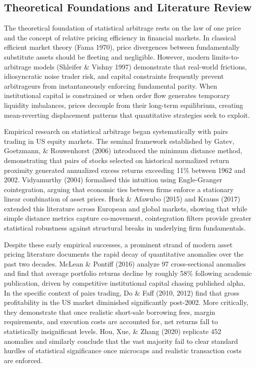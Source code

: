 \subsection{Theoretical Foundations and Literature Review}
The theoretical foundation of statistical arbitrage rests on the law of one price and the concept of relative pricing efficiency in financial markets. In classical efficient market theory (Fama 1970), price divergences between fundamentally substitute assets should be fleeting and negligible. However, modern limits-to-arbitrage models (Shleifer \& Vishny 1997) demonstrate that real-world frictions, idiosyncratic noise trader risk, and capital constraints frequently prevent arbitrageurs from instantaneously enforcing fundamental parity. When institutional capital is constrained or when order flow generates temporary liquidity imbalances, prices decouple from their long-term equilibrium, creating mean-reverting displacement patterns that quantitative strategies seek to exploit.

Empirical research on statistical arbitrage began systematically with pairs trading in US equity markets. The seminal framework established by Gatev, Goetzmann, \& Rouwenhorst (2006) introduced the minimum distance method, demonstrating that pairs of stocks selected on historical normalized return proximity generated annualized excess returns exceeding 11\% between 1962 and 2002. Vidyamurthy (2004) formalised this intuition using Engle-Granger cointegration, arguing that economic ties between firms enforce a stationary linear combination of asset prices. Huck \& Afawubo (2015) and Krauss (2017) extended this literature across European and global markets, showing that while simple distance metrics capture co-movement, cointegration filters provide greater statistical robustness against structural breaks in underlying firm fundamentals.

Despite these early empirical successes, a prominent strand of modern asset pricing literature documents the rapid decay of quantitative anomalies over the past two decades. McLean \& Pontiff (2016) analyze 97 cross-sectional anomalies and find that average portfolio returns decline by roughly 58\% following academic publication, driven by competitive institutional capital chasing published alpha. In the specific context of pairs trading, Do \& Faff (2010, 2012) find that gross profitability in the US market diminished significantly post-2002. More critically, they demonstrate that once realistic short-sale borrowing fees, margin requirements, and execution costs are accounted for, net returns fall to statistically insignificant levels. Hou, Xue, \& Zhang (2020) replicate 452 anomalies and similarly conclude that the vast majority fail to clear standard hurdles of statistical significance once microcaps and realistic transaction costs are enforced.

